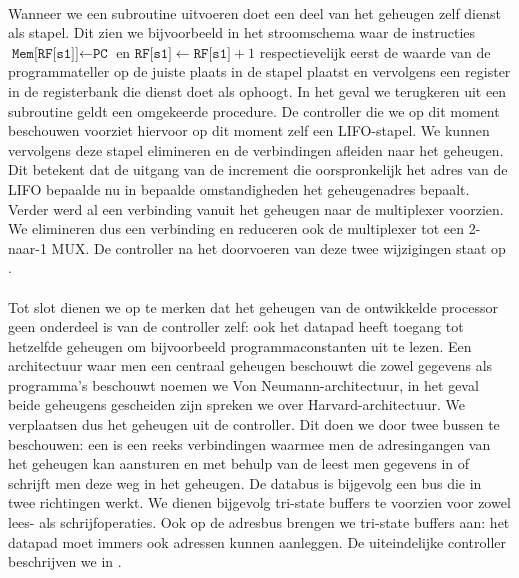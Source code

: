 \paragraph{}
Wanneer we een subroutine uitvoeren doet een deel van het geheugen zelf dienst als stapel. Dit zien we bijvoorbeeld in het stroomschema waar de instructies $\texttt{Mem[RF[s1]]}\leftarrow\texttt{PC}$ en $\texttt{RF[s1]}\leftarrow\texttt{RF[s1]}+1$ respectievelijk eerst de waarde van de programmateller op de juiste plaats in de stapel plaatst en vervolgens een register in de registerbank die dienst doet als  ophoogt. In het geval we terugkeren uit een subroutine geldt een omgekeerde procedure. De controller die we op dit moment beschouwen voorziet hiervoor op dit moment zelf een LIFO-stapel. We kunnen vervolgens deze stapel elimineren en de verbindingen afleiden naar het geheugen. Dit betekent dat de uitgang van de increment die oorspronkelijk het adres van de LIFO bepaalde nu in bepaalde omstandigheden het geheugenadres bepaalt. Verder werd al een verbinding vanuit het geheugen naar de multiplexer voorzien. We elimineren dus een verbinding en reduceren ook de multiplexer tot een 2-naar-1 MUX. De controller na het doorvoeren van deze twee wijzigingen staat op .
\paragraph{}
Tot slot dienen we op te merken dat het geheugen van de ontwikkelde processor geen onderdeel is van de controller zelf: ook het datapad heeft toegang tot hetzelfde geheugen om bijvoorbeeld programmaconstanten uit te lezen. Een architectuur waar men een centraal geheugen beschouwt die zowel gegevens als programma's beschouwt noemen we Von Neumann-architectuur, in het geval beide geheugens gescheiden zijn spreken we over Harvard-architectuur. We verplaatsen dus het geheugen uit de controller. Dit doen we door twee bussen te beschouwen: een  is een reeks verbindingen waarmee men de adresingangen van het geheugen kan aansturen en met behulp van de  leest men gegevens in of schrijft men deze weg in het geheugen. De databus is bijgevolg een bus die in twee richtingen werkt. We dienen bijgevolg tri-state buffers te voorzien voor zowel lees- als schrijfoperaties. Ook op de adresbus brengen we tri-state buffers aan: het datapad moet immers ook adressen kunnen aanleggen. De uiteindelijke controller beschrijven we in .
